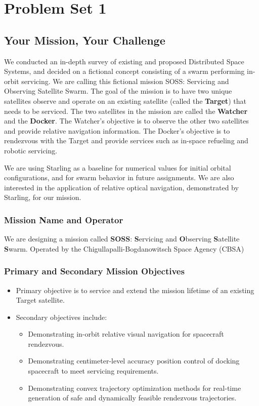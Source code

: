 \section{Problem Set 1}
\subsection{Your Mission, Your Challenge}

We conducted an in-depth survey of existing and proposed Distributed Space Systems, and decided on a fictional concept consisting of a swarm performing in-orbit servicing. We are calling this fictional mission SOSS: Servicing and Observing Satellite Swarm. The goal of the mission is to have two unique satellites observe and operate on an existing satellite (called the \textbf{Target}) that needs to be serviced. The two satellites in the mission are called the \textbf{Watcher} and the \textbf{Docker}. The Watcher's objective is to observe the other two satellites and provide relative navigation information. The Docker's objective is to rendezvous with the Target and provide services such as in-space refueling and robotic servicing.

We are using Starling \cite{krugerorbit} as a baseline for numerical values for initial orbital configurations, and for swarm behavior in future assignments. We are also interested in the application of relative optical navigation, demonstrated by Starling, for our mission.

\subsubsection{Mission Name and Operator}
We are designing a mission called \textbf{SOSS}: \textbf{S}ervicing and \textbf{O}bserving \textbf{S}atellite \textbf{S}warm. Operated by the Chigullapalli-Bogdanowitsch Space Agency (CBSA)

\subsubsection{Primary and Secondary Mission Objectives}
\begin{itemize}
    \item Primary objective is to service and extend the mission lifetime of an existing Target satellite.
    \item Secondary objectives include:
    \begin{itemize}
        \item Demonstrating in-orbit relative visual navigation for spacecraft rendezvous.
        \item Demonstrating centimeter-level accuracy position control of docking spacecraft to meet servicing requirements.
        \item Demonstrating convex trajectory optimization methods for real-time generation of safe and dynamically feasible rendezvous trajectories.
    \end{itemize}
\end{itemize}
    

